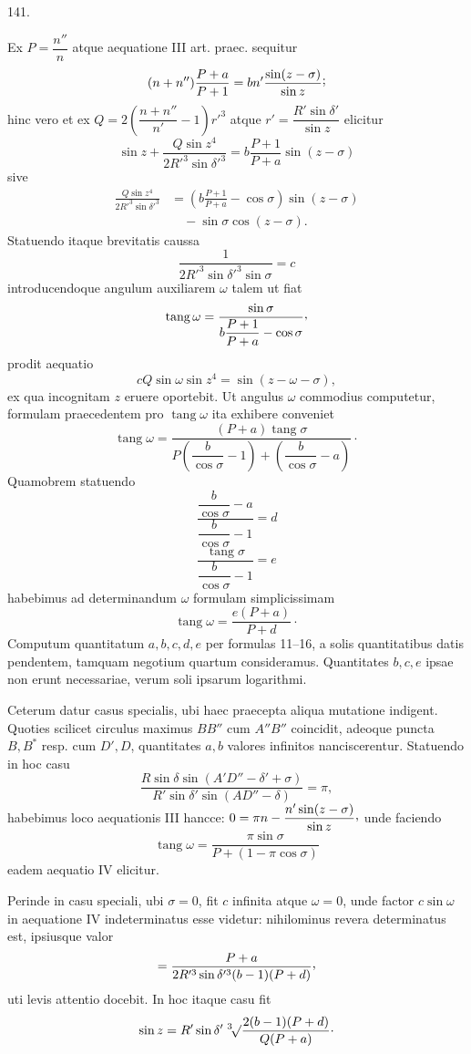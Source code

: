 \par{}\medskip
\begin{center}\hypertarget{native-189-article141}{}141.\end{center}
Ex $P=\dfrac{n''}{n}$ atque aequatione III art. praec. sequitur
\[
(n+n'')\frac{P+a}{P+1}=bn'\frac{\sin(z-\sigma)}{\sin z}\mathpunct{\raisebox{.45ex}{;}}
\]
hinc vero et ex $Q=2\left(\dfrac{n+n''}{n'}-1\right)r'^3$ atque $r'=\dfrac{R'\sin\delta'}{\sin z}$ elicitur
\[
\sin z+\frac{Q\sin z^4}{2R'^3\sin\delta'^3}=b\frac{P+1}{P+a}\sin(z-\sigma)
\]
sive
\[
\begin{aligned}
\frac{Q\sin z^4}{2R'^3\sin\delta'^3}&=\left(b\frac{P+1}{P+a}-\cos\sigma\right)\sin(z-\sigma)\\[.5ex]
&\quad-\sin\sigma\cos(z-\sigma).
\end{aligned}
\]
Statuendo itaque brevitatis caussa
\[
\tag*{14)}\frac{1}{2R'^3\sin\delta'^3\sin\sigma}=c
\]
introducendoque angulum auxiliarem $\omega$ talem ut fiat
\[
\operatorname{tang}\omega=\frac{\sin\sigma}{b\dfrac{P+1}{P+a}-\cos\sigma}\mathpunct{\raisebox{.45ex}{,}}
\]
prodit aequatio
\[
\tag*{IV.}cQ\sin\omega\sin z^4=\sin(z-\omega-\sigma),
\]
ex qua incognitam $z$ eruere oportebit. Ut angulus $\omega$ commodius computetur,
formulam praecedentem pro $\operatorname{tang}\omega$ ita exhibere conveniet
\[
\operatorname{tang}\omega=\frac{(P+a)\operatorname{tang}\sigma}{P\left(\dfrac{b}{\cos\sigma}-1\right)+\left(\dfrac{b}{\cos\sigma}-a\right)}\mathpunct{\cdot}
\]
Quamobrem statuendo
\[
\tag*{15)}\frac{\dfrac{b}{\cos\sigma}-a}{\dfrac{b}{\cos\sigma}-1}=d
\]
\[
\tag*{16)}\frac{\operatorname{tang}\sigma}{\dfrac{b}{\cos\sigma}-1}=e
\]
habebimus ad determinandum $\omega$ formulam simplicissimam
\[
\operatorname{tang}\omega=\frac{e(P+a)}{P+d}\mathpunct{\cdot}
\]
Computum quantitatum $a,b,c,d,e$ per formulas 11–16, a solis quantitatibus
datis pendentem, tamquam negotium quartum consideramus. Quantitates $b,c,e$
ipsae non erunt necessariae, verum soli ipsarum logarithmi.

Ceterum datur casus specialis, ubi haec praecepta aliqua mutatione indigent.
Quoties scilicet circulus maximus $BB''$ cum $A''B''$ coincidit, adeoque
puncta $B,B^\ast$ resp. cum $D',D$, quantitates $a,b$ valores infinitos nanciscerentur.
Statuendo in hoc casu
\[
\frac{R\sin\delta\sin(A'D''-\delta'+\sigma)}{R'\sin\delta'\sin(AD''-\delta)}=\pi,
\]
habebimus loco aequationis III hancce: $0=\pi n-\dfrac{n'\sin(z-\sigma)}{\sin z}\mathpunct{\raisebox{.45ex}{,}}$ unde faciendo
\[
\operatorname{tang}\omega=\frac{\pi\sin\sigma}{P+(1-\pi\cos\sigma)}
\]
eadem aequatio IV elicitur.

Perinde in casu speciali, ubi $\sigma=0$, fit $c$ infinita atque $\omega=0$, unde factor
$c\sin\omega$ in aequatione IV indeterminatus esse videtur: nihilominus revera
determinatus est, ipsiusque valor
\[
=\frac{P+a}{2R'^3\sin\delta'^3(b-1)(P+d)}\mathpunct{\raisebox{.45ex}{,}}
\]
uti levis attentio docebit. In hoc itaque casu fit
\[
\sin z=R'\sin\delta'\;\BareRoot[3]{\frac{2(b-1)(P+d)}{Q(P+a)}}\mathpunct{\cdot}
\]
